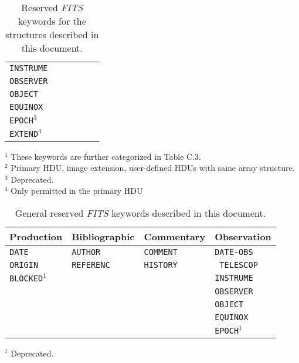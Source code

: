 \documentclass[11pt,makeidx]{book}     %
\begin{document}
\begin{table}[htpb]
\begin{center}
\begin{tabular}{llllll}
{\tt INSTRUME} &                &                 &                 &                 &               \\        
{\tt OBSERVER} &                &                 &                 &                 &               \\        
{\tt OBJECT}   &                &                 &                 &                 &               \\        
{\tt EQUINOX}  &                &                 &                 &                 &               \\        
{\tt EPOCH}$^{3}$  &            &                 &                 &                 &               \\
{\tt EXTEND}$^{4}$  &         &                 &                 &                 &               \\
  \hline
\end{tabular}
\end{center}

$^1$ These keywords are further categorized in Table C.3. \\
$^2$ Primary HDU, image extension, user-defined HDUs with same array
     structure. \\
$^3$ Deprecated. \\
$^4$ Only permitted in the primary HDU

\caption[Reserved {\em FITS\/} keywords]
         {Reserved {\em FITS\/} keywords for the 
          structures described in this document.}
\end{table}

\begin{table}[htpb]
\begin{center}
\begin{tabular}{llll} \\  \hline \hline
\multicolumn{1}{c}{Production} & \multicolumn{1}{c}{Bibliographic} & 
\multicolumn{1}{c}{Commentary} & \multicolumn{1}{c}{Observation}  
\\ \hline
{\tt DATE}    & {\tt AUTHOR}      & {\tt COMMENT}   & {\tt DATE-OBS}
\\
{\tt ORIGIN}   & {\tt REFERENC}     & {\tt HISTORY}   & {\tt
TELESCOP}     \\
{\tt BLOCKED}$^{1}$&               &\verb*+        + & {\tt INSTRUME} \\
               &                    &                 & {\tt OBSERVER}     \\
               &                    &                 & {\tt OBJECT}       \\
               &                    &                 & {\tt EQUINOX}      \\
               &                    &                 & {\tt EPOCH}$^{1}$  \\
\hline
\end{tabular}
\end{center}
$^1$ Deprecated.
\caption[General Reserved {\em FITS\/} keywords]
        {General reserved {\em FITS\/} keywords described in this
document. }
\end{table}
\end{document}
